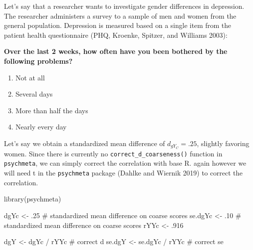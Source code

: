 \documentclass[
  letterpaper,
  DIV=11,
  numbers=noendperiod]{scrreprt}
\newenvironment{Shaded}{}{}
\newcommand{\CommentTok}[1]{\textcolor[rgb]{0.54,0.53,0.53}{#1}}
\newcommand{\DecValTok}[1]{\textcolor[rgb]{0.69,0.50,0.00}{#1}}
\newcommand{\FunctionTok}[1]{\textcolor[rgb]{0.39,0.29,0.61}{#1}}
\newcommand{\NormalTok}[1]{\textcolor[rgb]{0.12,0.11,0.11}{#1}}
\newcommand{\OtherTok}[1]{\textcolor[rgb]{0.00,0.43,0.16}{#1}}
\newcommand{\SpecialCharTok}[1]{\textcolor[rgb]{0.24,0.68,0.91}{#1}}
\providecommand{\tightlist}{%
  \setlength{\itemsep}{0pt}\setlength{\parskip}{0pt}}\usepackage{longtable,booktabs,array}
\begin{document}
\begin{tcolorbox}[enhanced jigsaw, opacityback=0, coltitle=black, toprule=.15mm, colframe=quarto-callout-note-color-frame, bottomtitle=1mm, rightrule=.15mm, colbacktitle=quarto-callout-note-color!10!white, left=2mm, bottomrule=.15mm, breakable, title={Applied Example in R}, colback=white, opacitybacktitle=0.6, titlerule=0mm, arc=.35mm, leftrule=.75mm, toptitle=1mm]

Let's say that a researcher wants to investigate gender differences in
depression. The researcher administers a survey to a sample of men and
women from the general population. Depression is measured based on a
single item from the patient health questionnaire (PHQ, Kroenke,
Spitzer, and Williams 2003):

\textbf{Over the last 2 weeks, how often have you been bothered by the
following problems?}

\begin{enumerate}
\def\labelenumi{\arabic{enumi}.}
\tightlist
\item
  Not at all
\item
  Several days
\item
  More than half the days
\item
  Nearly every day
\end{enumerate}

Let's say we obtain a standardized mean difference of \(d_{g Y_C}=.25\),
slightly favoring women. Since there is currently no
\texttt{correct\_d\_coarseness()} function in \texttt{psychmeta}, we can
simply correct the correlation with base R. again however we will need t
in the \texttt{psychmeta} package (Dahlke and Wiernik 2019) to correct
the correlation.

\begin{Shaded}
\begin{Highlighting}[]
\FunctionTok{library}\NormalTok{(psychmeta)}

\NormalTok{dgYc }\OtherTok{\textless{}{-}}\NormalTok{ .}\DecValTok{25} \CommentTok{\# standardized mean difference on coarse scores}
\NormalTok{se.dgYc }\OtherTok{\textless{}{-}}\NormalTok{ .}\DecValTok{10} \CommentTok{\# standardized mean difference on coarse scores}
\NormalTok{rYYc }\OtherTok{\textless{}{-}}\NormalTok{ .}\DecValTok{916}

\NormalTok{dgY }\OtherTok{\textless{}{-}}\NormalTok{ dgYc }\SpecialCharTok{/}\NormalTok{ rYYc }\CommentTok{\# correct d}
\NormalTok{se.dgY }\OtherTok{\textless{}{-}}\NormalTok{ se.dgYc }\SpecialCharTok{/}\NormalTok{ rYYc }\CommentTok{\# correct se}


\end{Highlighting}
\end{Shaded}
\end{tcolorbox}
\end{document}

